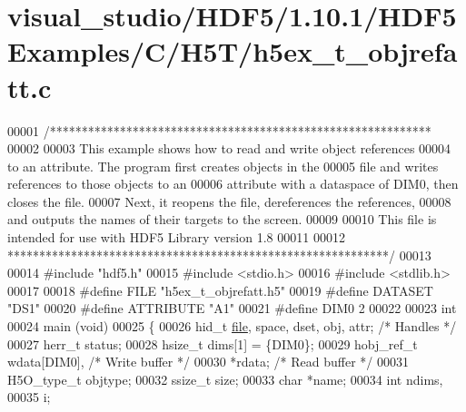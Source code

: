 \hypertarget{visual__studio_2_h_d_f5_21_810_81_2_h_d_f5_examples_2_c_2_h5_t_2h5ex__t__objrefatt_8c_source}{}\section{visual\+\_\+studio/\+H\+D\+F5/1.10.1/\+H\+D\+F5\+Examples/\+C/\+H5\+T/h5ex\+\_\+t\+\_\+objrefatt.c}
\label{visual__studio_2_h_d_f5_21_810_81_2_h_d_f5_examples_2_c_2_h5_t_2h5ex__t__objrefatt_8c_source}

\begin{DoxyCode}
00001 \textcolor{comment}{/************************************************************}
00002 \textcolor{comment}{}
00003 \textcolor{comment}{  This example shows how to read and write object references}
00004 \textcolor{comment}{  to an attribute.  The program first creates objects in the}
00005 \textcolor{comment}{  file and writes references to those objects to an}
00006 \textcolor{comment}{  attribute with a dataspace of DIM0, then closes the file.}
00007 \textcolor{comment}{  Next, it reopens the file, dereferences the references,}
00008 \textcolor{comment}{  and outputs the names of their targets to the screen.}
00009 \textcolor{comment}{}
00010 \textcolor{comment}{  This file is intended for use with HDF5 Library version 1.8}
00011 \textcolor{comment}{}
00012 \textcolor{comment}{ ************************************************************/}
00013 
00014 \textcolor{preprocessor}{#include "hdf5.h"}
00015 \textcolor{preprocessor}{#include <stdio.h>}
00016 \textcolor{preprocessor}{#include <stdlib.h>}
00017 
00018 \textcolor{preprocessor}{#define FILE            "h5ex\_t\_objrefatt.h5"}
00019 \textcolor{preprocessor}{#define DATASET         "DS1"}
00020 \textcolor{preprocessor}{#define ATTRIBUTE       "A1"}
00021 \textcolor{preprocessor}{#define DIM0            2}
00022 
00023 \textcolor{keywordtype}{int}
00024 main (\textcolor{keywordtype}{void})
00025 \{
00026     hid\_t       \hyperlink{structfile}{file}, space, dset, obj, attr;   \textcolor{comment}{/* Handles */}
00027     herr\_t      status;
00028     hsize\_t     dims[1] = \{DIM0\};
00029     hobj\_ref\_t  wdata[DIM0],                    \textcolor{comment}{/* Write buffer */}
00030                 *rdata;                         \textcolor{comment}{/* Read buffer */}
00031     H5O\_type\_t  objtype;
00032     ssize\_t     size;
00033     \textcolor{keywordtype}{char}        *name;
00034     \textcolor{keywordtype}{int}         ndims,
00035                 i;

\end{DoxyCode}
